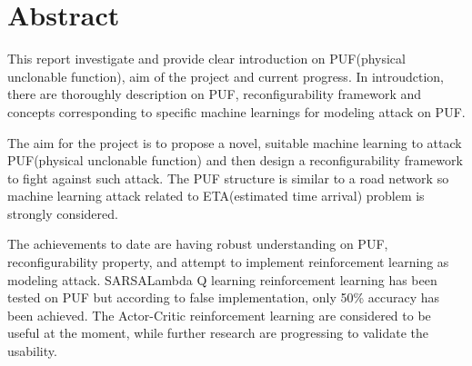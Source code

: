 \chapter*{\Large \center Abstract}
\setlength{\parskip}{\baselineskip}%
\setlength{\parindent}{0pt}%

\begin{flushleft}
This report investigate and provide clear introduction on PUF(physical unclonable function), aim of the project and current progress.
In introudction, there are thoroughly description on PUF, reconfigurability framework and concepts corresponding to specific machine learnings for modeling attack on PUF.
\par

The aim for the project is to propose a novel, suitable machine learning to attack PUF(physical unclonable function)
and then design a reconfigurability framework to fight against such attack. The PUF structure is similar to a road network so 
machine learning attack related to ETA(estimated time arrival) problem is strongly considered.
\par

The achievements to date are having robust understanding on PUF, reconfigurability property, and attempt to implement reinforcement learning as modeling attack. 
SARSALambda Q learning reinforcement learning has been tested on PUF but according to false implementation, only 50\% accuracy has been achieved.
The Actor-Critic reinforcement learning are considered to be useful at the moment, while further research are progressing to validate the usability.
\end{flushleft}
